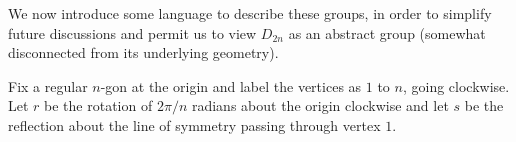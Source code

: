 \documentclass[10pt, oneside]{article}
\begin{document}
We now introduce some language to describe these groups, in order to simplify future discussions and permit us to view $D_{2n}$ as an abstract group (somewhat disconnected from its underlying geometry).

Fix a regular $n$-gon at the origin and label the vertices as $1$ to $n$, going clockwise. Let $r$ be the rotation of $2\pi/n$ radians about the origin clockwise and let $s$ be the reflection about the line of symmetry passing through vertex $1$.
\end{document}
